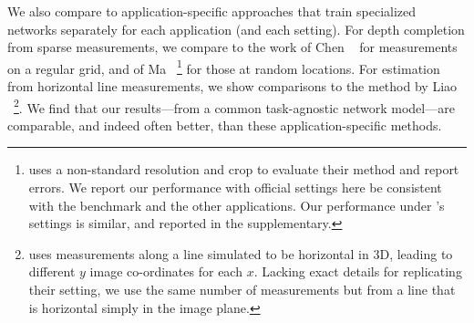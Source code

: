 \documentclass[10pt,twocolumn,letterpaper]{article}
\begin{document}
We also compare to application-specific approaches that train specialized networks separately for each application (and each setting). For depth completion from sparse measurements, we compare to the work of Chen \etal~\cite{chen2018estimating} for measurements on a regular grid, and of Ma \etal~\cite{ma2018sparse}\footnote{\cite{ma2018sparse} uses a non-standard resolution and crop to evaluate their method and report errors. We report our performance with official settings here be consistent with the benchmark and the other applications. Our performance under \cite{ma2018sparse}'s settings is similar, and reported in the supplementary.}  for those at random locations. For estimation from horizontal line measurements, we show comparisons to the method by Liao \etal~\cite{liao2017sparse}\footnote{\cite{liao2017sparse} uses measurements along a line simulated to be horizontal in 3D, leading to different $y$ image co-ordinates for each $x$. Lacking exact details for replicating their setting, we use the same number of measurements but from a line that is horizontal simply in the image plane.}. We find that our results---from a common task-agnostic network model---are comparable, and indeed often better, than these application-specific methods.
\end{document}
